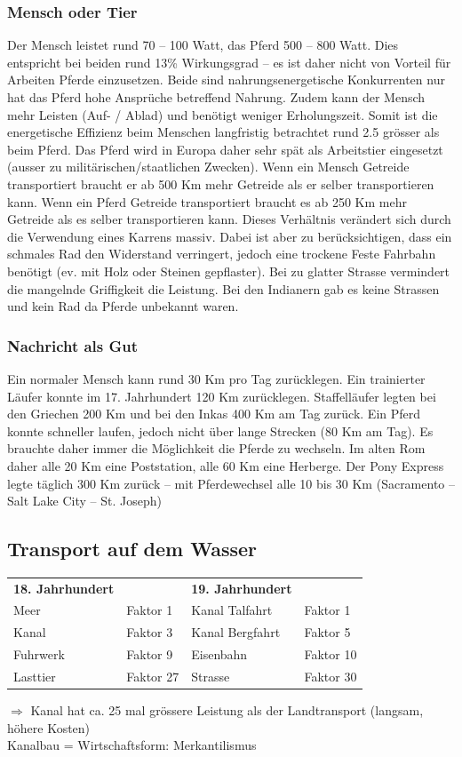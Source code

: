 \documentclass[10pt, openright=true]{scrartcl}
\begin{document}
\subsubsection{Mensch oder Tier}
Der Mensch leistet rund 70 – 100 Watt, das Pferd 500 – 800 Watt. Dies entspricht bei beiden rund 13\% Wirkungsgrad – es ist daher nicht von Vorteil für Arbeiten Pferde
einzusetzen. Beide sind nahrungsenergetische Konkurrenten nur hat das Pferd hohe Ansprüche betreffend Nahrung. Zudem kann der Mensch mehr Leisten (Auf- / Ablad) und benötigt weniger Erholungszeit. Somit ist die energetische Effizienz beim Menschen langfristig betrachtet rund 2.5 grösser als beim Pferd. Das Pferd wird in Europa daher sehr spät als Arbeitstier eingesetzt (ausser zu militärischen/staatlichen Zwecken). Wenn ein Mensch Getreide transportiert braucht er ab 500 Km mehr Getreide als er selber transportieren kann. Wenn ein Pferd Getreide transportiert braucht es ab 250 Km mehr Getreide als es selber transportieren kann. Dieses Verhältnis verändert sich durch die Verwendung eines Karrens massiv. Dabei ist aber zu berücksichtigen, dass ein schmales Rad den Widerstand verringert, jedoch eine trockene Feste Fahrbahn benötigt (ev. mit Holz oder Steinen gepflaster). Bei zu glatter Strasse vermindert die mangelnde Griffigkeit die Leistung. Bei den Indianern gab es keine Strassen und kein Rad da Pferde unbekannt waren. 
\subsubsection{Nachricht als Gut}
Ein normaler Mensch kann rund 30 Km pro Tag zurücklegen. Ein trainierter Läufer konnte im 17. Jahrhundert 120 Km zurücklegen. Staffelläufer legten bei den Griechen 200 Km und bei den Inkas 400 Km am Tag zurück. Ein Pferd konnte schneller laufen, jedoch nicht über lange Strecken (80 Km am Tag). Es brauchte daher immer die Möglichkeit die Pferde zu wechseln. Im alten Rom daher alle 20 Km eine Poststation, alle 60 Km eine Herberge. Der Pony Express legte täglich 300 Km zurück – mit Pferdewechsel alle 10 bis 30 Km (Sacramento – Salt Lake City – St. Joseph)
\subsection{Transport auf dem Wasser}
\begin{tabularx}{1\textwidth}{L{3cm} L{4cm} L{4cm} X}
 \textbf{18. Jahrhundert} &  & \textbf{19. Jahrhundert} & \\  
Meer & Faktor 1 & Kanal Talfahrt & Faktor 1\\
 Kanal & Faktor 3 & Kanal Bergfahrt & Faktor 5\\
Fuhrwerk & Faktor 9 & Eisenbahn & Faktor 10\\
 Lasttier & Faktor 27 & Strasse & Faktor 30\\
\end{tabularx}
$ \Rightarrow $ Kanal hat ca. 25 mal grössere Leistung als der Landtransport (langsam, höhere Kosten)\\
Kanalbau = Wirtschaftsform: Merkantilismus
\end{document}
